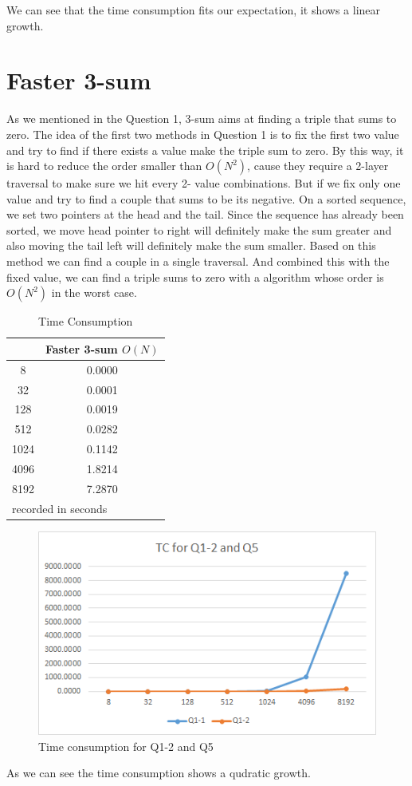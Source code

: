 \documentclass[conference]{IEEEtran}
\begin{document}
We can see that the time consumption fits our expectation, it shows a linear growth.

\section*{Faster 3-sum}
As we mentioned in the Question 1, 3-sum aims at finding a triple that sums to zero.
The idea of the first two methods in Question 1 is to fix the first two value and try 
to find if there exists a value make the triple sum to zero. By this way, it is hard to 
reduce the order smaller than $O(N^2)$, cause they require a 2-layer traversal to make
sure we hit every 2- value combinations. 
But if we fix only one value and try to find a couple that sums to be its negative. 
On a sorted sequence, we set two pointers at the head and the tail. Since the sequence
has already been sorted, we move head pointer to right will definitely make the sum 
greater and also moving the tail left will definitely make the sum smaller. Based on this
method we can find a couple in a single traversal. And combined this with the fixed value,
we can find a triple sums to zero with a algorithm whose order is $O(N^2)$ in the worst case.

\begin{table}[H]
    \caption{Time Consumption}
    \begin{center}
        \begin{tabular}{|c|c|}
            \hline
             & Faster 3-sum $O(N)$\\
            \hline
            8	&0.0000\\
            \hline
            32	&0.0001\\
            \hline
            128	&0.0019\\
            \hline
            512	&0.0282\\
            \hline
            1024&	0.1142\\
            \hline
            4096&	1.8214\\
            \hline
            8192&	7.2870\\
            \hline
            \multicolumn{2}{l}{recorded in seconds}\\
        \end{tabular}
    \end{center}
\end{table}

\begin{figure}[H]
    \centerline{\includegraphics[scale=0.5]{Pic/fig5.png}}
    \caption{Time consumption for Q1-2 and Q5}
\end{figure}

As we can see the time consumption shows a qudratic growth.
\end{document}

